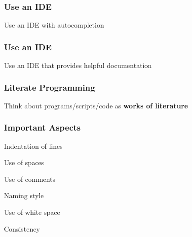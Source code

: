 \documentclass[12pt]{beamer}\usepackage[]{graphicx}\usepackage[]{color}
\begin{document}

\begin{frame}[fragile]
\frametitle{Use an IDE}

Use an IDE with autocompletion
\begin{center}
\end{center}
\end{frame}


\begin{frame}[fragile]
\frametitle{Use an IDE}

Use an IDE that provides helpful documentation 
\begin{center}
\end{center}
\end{frame}


\begin{frame}
\begin{center}
\Huge{}
\end{center}
\end{frame}


\begin{frame}[fragile]
\frametitle{Literate Programming}

Think about programs/scripts/code as \textbf{works of literature}

\end{frame}


\begin{frame}[fragile]
\frametitle{Important Aspects}

\bbi
  \item Indentation of lines
  \item Use of spaces
  \item Use of comments
  \item Naming style
  \item Use of white space
  \item Consistency
\ei

\end{frame}

\end{document}

